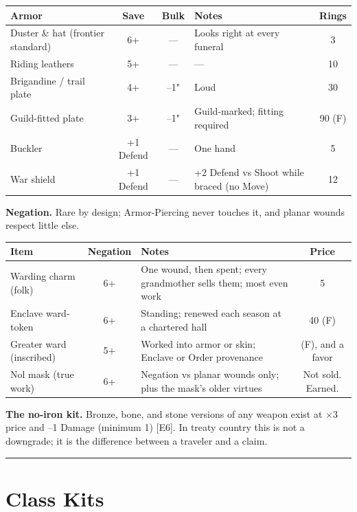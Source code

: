 \begin{center}
\small
\begin{tabular}{l|c|c|l|c}
\textbf{Armor} & \textbf{Save} & \textbf{Bulk} & \textbf{Notes} & \textbf{Rings} \\
\hline
Duster \& hat (frontier standard) & 6+ & --- & Looks right at every funeral & 3 \\
Riding leathers & 5+ & --- & --- & 10 \\
Brigandine / trail plate & 4+ & --1" & Loud & 30 \\
Guild-fitted plate & 3+ & --1" & Guild-marked; fitting required & 90 (F) \\
Buckler & +1 Defend & --- & One hand & 5 \\
War shield & +1 Defend & --- & +2 Defend vs Shoot while braced (no Move) & 12 \\
\end{tabular}
\end{center}

\textbf{Negation.} Rare by design; Armor-Piercing never touches it, and planar wounds respect little else.

\begin{center}
\small
\begin{tabular}{l|c|l|c}
\textbf{Item} & \textbf{Negation} & \textbf{Notes} & \textbf{Price} \\
\hline
Warding charm (folk) & 6+ & One wound, then spent; every grandmother sells them; most even work & 5 \\
Enclave ward-token & 6+ & Standing; renewed each season at a chartered hall & 40 (F) \\
Greater ward (inscribed) & 5+ & Worked into armor or skin; Enclave or Order provenance & (F), and a favor \\
Nol mask (true work) & 6+ & Negation vs planar wounds only; plus the mask's older virtues & Not sold. Earned. \\
\end{tabular}
\end{center}

\textbf{The no-iron kit.} Bronze, bone, and stone versions of any weapon exist at ×3 price and --1 Damage (minimum 1) [E6]. In treaty country this is not a downgrade; it is the difference between a traveler and a claim.

\medskip\hrule\medskip

\section{Class Kits}

